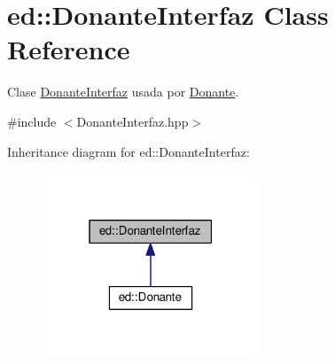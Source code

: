 \hypertarget{classed_1_1DonanteInterfaz}{}\section{ed\+:\+:Donante\+Interfaz Class Reference}
\label{classed_1_1DonanteInterfaz}


Clase \hyperlink{classed_1_1DonanteInterfaz}{Donante\+Interfaz} usada por \hyperlink{classed_1_1Donante}{Donante}.  




{\ttfamily \#include $<$Donante\+Interfaz.\+hpp$>$}



Inheritance diagram for ed\+:\+:Donante\+Interfaz\+:\nopagebreak
\begin{figure}[H]
\begin{center}
\leavevmode
\includegraphics[width=183pt]{classed_1_1DonanteInterfaz__inherit__graph}
\end{center}
\end{figure}
